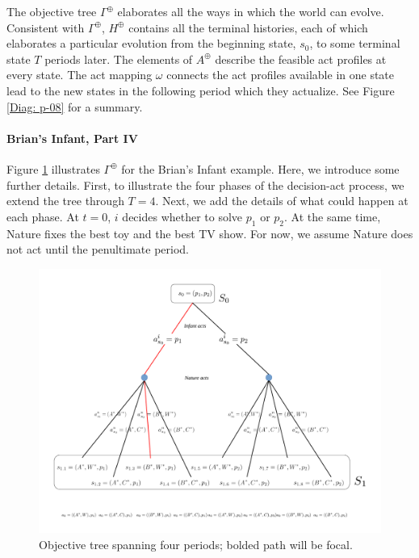 \documentclass[
11pt,
titlepage,
reqno,
]{article}%
\theoremstyle{definition}
\begin{document}
The objective tree $\Gamma^\oplus$ elaborates all the ways in which the world can evolve.
Consistent with $\Gamma^\oplus$, $H^\oplus$ contains all the terminal histories, each of which elaborates a particular evolution from the beginning state, $s_0$, to some terminal state $T$ periods later.
The elements of $A^\oplus$ describe the feasible act profiles at every state.
The act mapping $\omega$ connects the act profiles available in one state lead to the new states in the following period which they actualize.
See Figure \ref{Diag: p-08} for a summary.



\paragraph{Brian's Infant, Part IV}
Figure \ref{Diag: p-04} illustrates $\Gamma^\oplus$ for the Brian's Infant example. 
Here, we introduce some further details.
First, to illustrate the four phases of the decision-act process, we extend the tree through $T=4$.
Next, we add the details of what could happen at each phase.
At $t=0$, $i$ decides whether to solve $p_1$ or $p_2$.
At the same time, Nature fixes the best toy and the best TV show. 
For now, we assume Nature does not act until the penultimate period.

\begin{figure}[h!]
	\centering
	\includegraphics*[page=4,trim = 0in 0in 0in 0in,scale=.65]{Awareness_Diagrams_All}
	\caption{Objective tree spanning four periods; bolded path will be focal.\label{Diag: p-04}}%
\end{figure}
\end{document}
